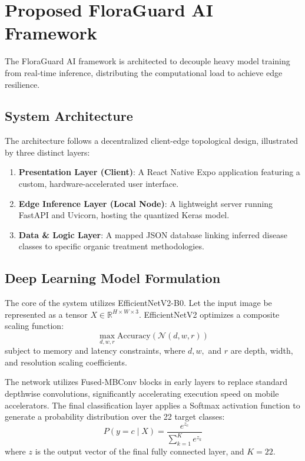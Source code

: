 \documentclass[conference]{IEEEtran}
\begin{document}
\section{Proposed FloraGuard AI Framework}
The FloraGuard AI framework is architected to decouple heavy model training from real-time inference, distributing the computational load to achieve edge resilience.

\subsection{System Architecture}
The architecture follows a decentralized client-edge topological design, illustrated by three distinct layers:
\begin{enumerate}
    \item \textbf{Presentation Layer (Client)}: A React Native Expo application featuring a custom, hardware-accelerated user interface.
    \item \textbf{Edge Inference Layer (Local Node)}: A lightweight server running FastAPI and Uvicorn, hosting the quantized Keras model.
    \item \textbf{Data \& Logic Layer}: A mapped JSON database linking inferred disease classes to specific organic treatment methodologies.
\end{enumerate}

\subsection{Deep Learning Model Formulation}
The core of the system utilizes EfficientNetV2-B0. Let the input image be represented as a tensor $X \in \mathbb{R}^{H \times W \times 3}$. EfficientNetV2 optimizes a composite scaling function:
\begin{equation}
\max_{d, w, r} \text{Accuracy}(\mathcal{N}(d, w, r))
\end{equation}
subject to memory and latency constraints, where $d, w,$ and $r$ are depth, width, and resolution scaling coefficients.

The network utilizes Fused-MBConv blocks in early layers to replace standard depthwise convolutions, significantly accelerating execution speed on mobile accelerators. The final classification layer applies a Softmax activation function to generate a probability distribution over the 22 target classes:
\begin{equation}
P(y=c \mid X) = \frac{e^{z_c}}{\sum_{k=1}^{K} e^{z_k}}
\end{equation}
where $z$ is the output vector of the final fully connected layer, and $K = 22$.
\end{document}
